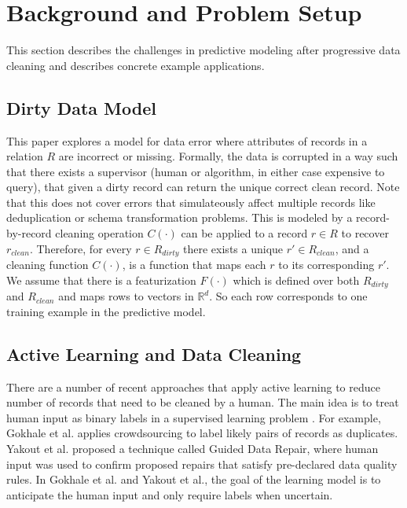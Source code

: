 \section{Background and Problem Setup}\label{background}
This section describes the challenges in predictive modeling after progressive data 
cleaning and describes concrete example applications.

\subsection{Dirty Data Model}\label{dmodel}
This paper explores a model for data error where attributes of records in a relation $R$ are incorrect or missing.
Formally, the data is corrupted in a way such that there exists a supervisor (human or algorithm, in either case expensive to query), that given a dirty record can return the unique correct clean record.
Note that this does not cover errors that simulateously affect multiple records like deduplication or schema transformation problems.
This is modeled by a record-by-record cleaning operation $C(\cdot)$ can be applied to a record $r \in R$ to recover $r_{clean}$.
Therefore, for every $r \in R_{dirty}$ there exists a unique $r' \in R_{clean}$, and a cleaning function $C(\cdot)$, is a function that maps each $r$ to its corresponding $r'$.
We assume that there is a featurization $F(\cdot)$ which is defined over both $R_{dirty}$ and $R_{clean}$ and maps rows to vectors in $\mathbb{R}^d$.
So each row corresponds to one training example in the predictive model.

\subsection{Active Learning and Data Cleaning}\label{alrw}
There are a number of recent approaches that apply active learning to reduce number of records that need to be cleaned by a human.
The main idea is to treat human input as binary labels in a supervised learning problem \cite{DBLP:journals/pvldb/MozafariSFJM14}.
For example, Gokhale et al. \cite{gokhale2014corleone} applies crowdsourcing to label likely pairs of records as duplicates.
Yakout et al. \cite{DBLP:journals/pvldb/YakoutENOI11} proposed a technique called Guided Data Repair, where human input was used to confirm proposed repairs that satisfy pre-declared data quality rules.
In Gokhale et al. and Yakout et al., the goal of the learning model is to anticipate the human input and only require labels when uncertain.

